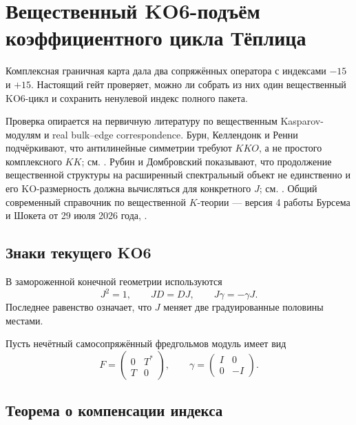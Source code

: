 \chapter{Вещественный KO6-подъём коэффициентного цикла Тёплица}

Комплексная граничная карта дала два сопряжённых оператора с индексами
$-15$ и $+15$. Настоящий гейт проверяет, можно ли собрать из них один
вещественный KO6-цикл и сохранить ненулевой индекс полного пакета.

Проверка опирается на первичную литературу по вещественным
Kasparov-модулям и real bulk--edge correspondence. Бурн, Келлендонк и
Ренни подчёркивают, что антилинейные симметрии требуют $KKO$, а не
простого комплексного $KK$; см. . Рубин и
Домбровский показывают, что продолжение вещественной структуры на
расширенный спектральный объект не единственно и его KO-размерность должна
вычисляться для конкретного $J$; см. . Общий
современный справочник по вещественной $K$-теории --- версия 4 работы
Бурсема и Шокета от 29 июля 2026 года,
.

\section{Знаки текущего KO6}

В замороженной конечной геометрии используются
\begin{equation}
 J^2=1,
 \qquad
 JD=DJ,
 \qquad
 J\gamma=-\gamma J.
 \label{eq:v5-real-toeplitz-ko6-signs}
\end{equation}
Последнее равенство означает, что $J$ меняет две градуированные половины
местами.

Пусть нечётный самосопряжённый фредгольмов модуль имеет вид
\begin{equation}
 F=
 \begin{pmatrix}
  0&T^*\\
  T&0
 \end{pmatrix},
 \qquad
 \gamma=
 \begin{pmatrix}
  I&0\\0&-I
 \end{pmatrix}.
 \label{eq:v5-real-toeplitz-F}
\end{equation}

\section{Теорема о компенсации индекса}

